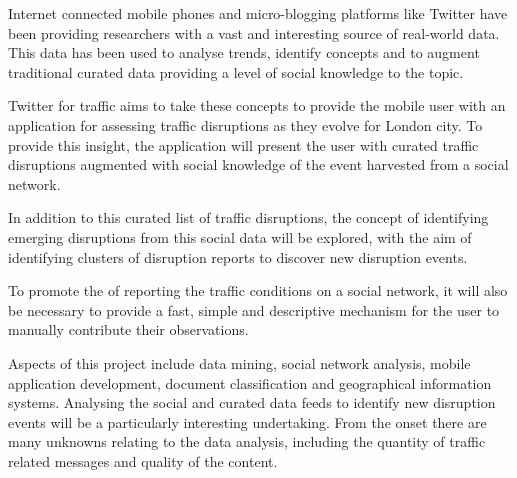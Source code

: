 Internet connected mobile phones and micro-blogging platforms like Twitter have
been providing researchers with a vast and interesting source of real-world
data. This data has been used to analyse trends, identify concepts and to
augment traditional curated data providing a level of social knowledge to the
topic. 

Twitter for traffic aims to take these concepts to provide the mobile user with
an application for assessing traffic disruptions as they evolve for London
city. To provide this insight, the application will present the user with
curated traffic disruptions augmented with social knowledge of the event
harvested from a social network. 

In addition to this curated list of traffic disruptions, the concept of
identifying emerging disruptions from this social data will be explored, with
the aim of identifying clusters of disruption reports to discover new
disruption events.

To promote the of reporting the traffic conditions on a social network, it will
also be necessary to provide a fast, simple and descriptive mechanism for the
user to manually contribute their observations.

Aspects of this project include data mining, social network analysis, mobile
application development, document classification and geographical information
systems. Analysing the social and curated data feeds to identify new disruption
events will be a particularly interesting undertaking. From the onset there are
many unknowns relating to the data analysis, including the quantity of traffic
related messages and quality of the content.
